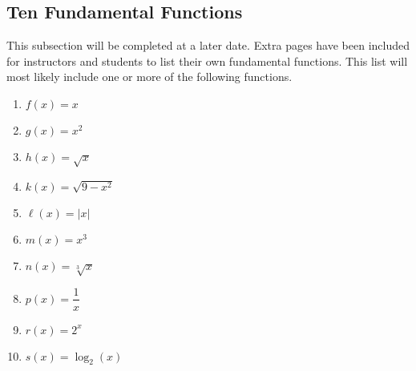 \subsection{Ten Fundamental Functions}

This subsection will be completed at a later date.  Extra pages have been included for instructors and students to list their own fundamental functions.  This list will most likely include one or more of the following functions.
\begin{enumerate}
\item $f(x)=x$
\item $g(x)=x^2$
\item $h(x)=\sqrt{x}$
\item $k(x)=\sqrt{9-x^2}$
\item $\ell(x)=|x|$
\item $m(x)=x^3$
\item $n(x)=\sqrt[3]{x}$
\item $p(x)=\dfrac{1}{x}$
\item $r(x)=2^x$
\item $s(x)=\log_2(x)$
\end{enumerate}

\newpage
~\\
\newpage
~\\
\newpage
~\\
\newpage
~\\
\newpage


